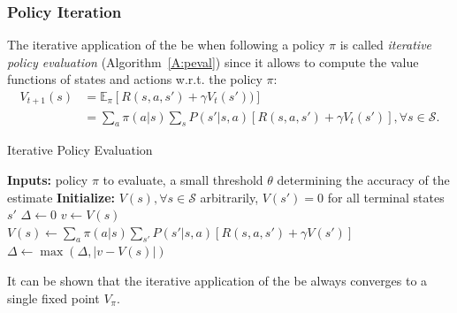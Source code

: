 \subsubsection{Policy Iteration}
The iterative application of the \gls{be} when following a policy $\pi$ is called \textit{iterative policy evaluation} (Algorithm~\ref{A:peval}) since it allows to compute the value functions of states and actions w.r.t. the policy $\pi$:
\begin{align}
 V_{t+1} (s) &= \mathbb{E}_\pi[R(s,a,s') + \gamma V_t(s'))]\nonumber\\
             &= \sum_a \pi(a|s) \sum_s P(s' | s, a)[R(s,a,s') + \gamma V_t(s')], \forall s \in \mathcal{S}. 
\end{align}
\begin{algorithm}[t]
 \caption{Iterative Policy Evaluation}
 \begin{algorithmic}[1]\label{A:peval}
  \STATE \textbf{Inputs:} policy $\pi$ to evaluate, a small threshold $\theta$ determining the accuracy of the estimate
  \STATE \textbf{Initialize:} $V(s), \forall s \in \mathcal{S}$ arbitrarily, $V(s') = 0$ for all terminal states $s'$
  \REPEAT
  \STATE $\Delta \gets 0$
  \STATE $v \gets V(s)$
  \STATE $V(s) \gets \sum_a \pi(a|s) \sum_{s'} P(s'|s,a)[R(s,a,s') + \gamma V(s')]$
  \STATE $\Delta \gets \max(\Delta, |v - V(s)|)$
  \ENDFOR
  \UNTIL{$\Delta < \theta$}
 \end{algorithmic}
\end{algorithm}
It can be shown that the iterative application of the \gls{be} always converges to a single fixed point $V_\pi$.

